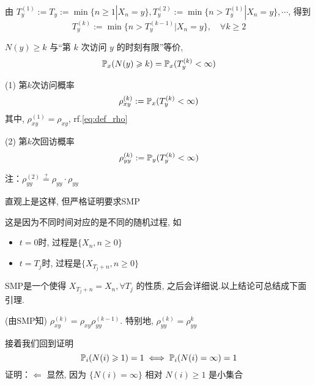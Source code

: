 \begin{definition}[第$k$次访问时间]
由 $T_y^{(1)}:=T_y:=\min\{n\geq 1|X_n=y\}, T_y^{(2)}:=\min\{n>T_y^{(1)}|X_n=y\}, \cdots$, 得到
\begin{equation}
T_y^{(k)}:=\min\{n>T_y^{(k-1)}|X_n=y\}, \quad \forall k\geq 2
\label{eq:revisit_k}
\end{equation}
\end{definition}

\begin{claim}
$N(y)\geq k$ 与“第 $k$ 次访问 $y$ 的时刻有限”等价, 
\begin{equation}
\mathbb{P}_x(N(y)\geqslant k)=\mathbb{P}_x(T_y^{(k)}<\infty)
\label{eq:time&count_k}
\end{equation}
\end{claim}

\begin{definition}
    (1) 第$k$次访问概率
    \begin{equation}
\rho_{xy}^{(k)}:=\mathbb{P}_x(T_y^{(k)}<\infty)
\label{eq:prob_visit_k}
\end{equation}
    其中, $\rho_{xy}^{(1)}=\rho_{xy}$, rf.\eqref{eq:def_rho}
    
    (2) 第$k$次回访概率
    \begin{equation}
    \rho_{yy}^{(k)}:=\mathbb{P}_y(T_y^{(k)}<\infty)
    \label{eq:prob_revisit_k}
\end{equation}
\end{definition}

注：$\rho_{yy}^{(2)}\overset{?}{=}\rho_{yy}\cdot \rho_{yy}$

直观上是这样, 但严格证明要求SMP

这是因为不同时间对应的是不同的随机过程, 如
\begin{itemize}
    \item $t=0$时, 过程是$\{X_n,n\geq 0\}$
    \item $t=T_j$时, 过程是$\{X_{T_j+n},n\geq 0\}$
\end{itemize}
SMP是一个使得 $X_{T_j+n}=X_n,\forall T_j$ 的性质, 之后会详细说.以上结论可总结成下面引理.

\begin{lemma}
    (由SMP知) $\rho_{xy}^{(k)}=\rho_{xy}\rho_{yy}^{(k-1)}$. 特别地, $\rho_{yy}^{(k)}=\rho_{yy}^k$
\end{lemma}

接着我们回到证明
\begin{equation}
\mathbb{P}_i(N(i)\geqslant 1)=1 \iff \mathbb{P}_i(N(i)=\infty)=1
\label{eq:equiv_count}
\end{equation}
证明：$\Leftarrow$ 显然, 因为 $\{N(i)=\infty\}$ 相对 $N(i)\geq 1$ 是小集合

